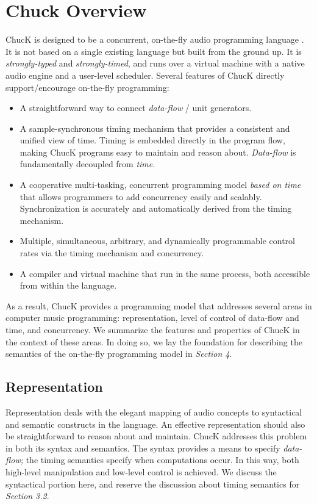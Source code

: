 \section{Chuck Overview}

ChucK is designed to be a concurrent, on-the-fly audio programming language
 \cite{Wang:2003}.  It is not based on a single existing language but built from the ground
up.  It is \textit{strongly-typed} and \textit{strongly-timed}, and runs over a
virtual machine with a native audio engine and a user-level scheduler.  Several
features of ChucK directly support/encourage on-the-fly programming:

\begin{itemize}
	\item A straightforward way to connect \textit{data-flow }/ unit generators.
	\item A sample-synchronous timing mechanism that provides a consistent and unified
view of time.  Timing is embedded directly in the program flow, making ChucK
programs easy to maintain and reason about.  \textit{Data-flow }is fundamentally
decoupled from\textit{ time}.
	\item A cooperative multi-tasking, concurrent programming model \textit{based on time}
that allows programmers to add concurrency easily and scalably.  Synchronization
is accurately and automatically derived from the timing mechanism.
	\item Multiple, simultaneous, arbitrary, and dynamically programmable control rates
via the timing mechanism and concurrency.
	\item A compiler and virtual machine that run in the same process, both accessible
from within the language.
\end{itemize}

As a result, ChucK provides a programming model that addresses several areas in
computer music programming: representation, level of control of data-flow and
time, and concurrency.  We summarize the features and properties of ChucK in the
context of these areas.  In doing so, we lay the foundation for describing the
semantics of the on-the-fly programming model in \textit{Section 4}.

\subsection{Representation}

Representation deals with the elegant mapping of audio concepts to syntactical
and semantic constructs in the language.  An effective representation should also
be straightforward to reason about and maintain.  ChucK addresses this problem in
both its syntax and semantics.  The syntax provides a means to specify
\textit{data-flow;} the timing semantics specify when computations occur.  In
this way, both high-level manipulation and low-level control is achieved.  We
discuss the syntactical portion here, and reserve the discussion about timing
semantics for \textit{Section 3.2}.

